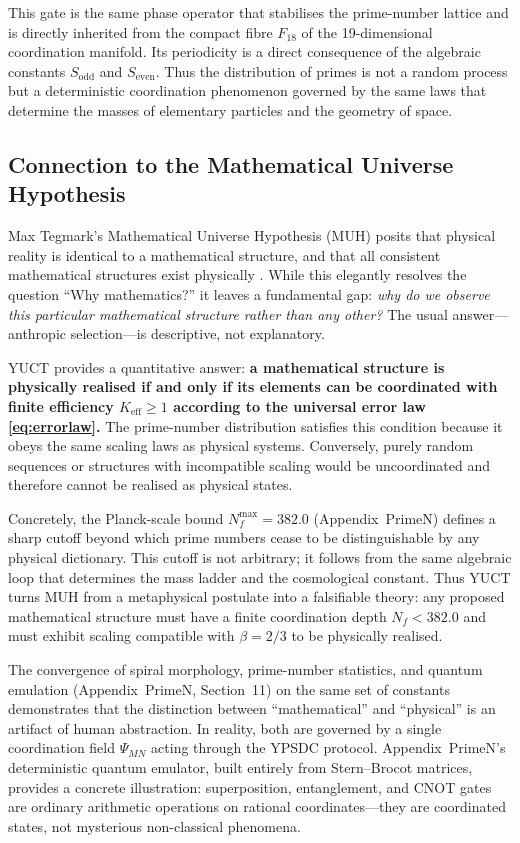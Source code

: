 \documentclass[12pt]{article}
\begin{document}
	This gate is the same phase operator that stabilises the prime-number lattice and is directly inherited from the compact fibre \(F_{18}\) of the 19-dimensional coordination manifold. Its periodicity is a direct consequence of the algebraic constants \(S_{\mathrm{odd}}\) and \(S_{\mathrm{even}}\). Thus the distribution of primes is not a random process but a deterministic coordination phenomenon governed by the same laws that determine the masses of elementary particles and the geometry of space.
	
	\subsection{Connection to the Mathematical Universe Hypothesis}
	
	Max Tegmark's Mathematical Universe Hypothesis (MUH) posits that physical reality is identical to a mathematical structure, and that all consistent mathematical structures exist physically \cite{Tegmark2014}. While this elegantly resolves the question ``Why mathematics?'' it leaves a fundamental gap: \emph{why do we observe this particular mathematical structure rather than any other?} The usual answer—anthropic selection—is descriptive, not explanatory.
	
	YUCT provides a quantitative answer: \textbf{a mathematical structure is physically realised if and only if its elements can be coordinated with finite efficiency \(K_{\mathrm{eff}} \ge 1\) according to the universal error law \eqref{eq:errorlaw}.} The prime-number distribution satisfies this condition because it obeys the same scaling laws as physical systems. Conversely, purely random sequences or structures with incompatible scaling would be uncoordinated and therefore cannot be realised as physical states.
	
	Concretely, the Planck-scale bound \(N_f^{\max} = 382.0\) (Appendix~PrimeN) defines a sharp cutoff beyond which prime numbers cease to be distinguishable by any physical dictionary. This cutoff is not arbitrary; it follows from the same algebraic loop that determines the mass ladder and the cosmological constant. Thus YUCT turns MUH from a metaphysical postulate into a falsifiable theory: any proposed mathematical structure must have a finite coordination depth \(N_f < 382.0\) and must exhibit scaling compatible with \(\beta = 2/3\) to be physically realised.
	
	The convergence of spiral morphology, prime-number statistics, and quantum emulation (Appendix~PrimeN, Section~11) on the same set of constants demonstrates that the distinction between ``mathematical'' and ``physical'' is an artifact of human abstraction. In reality, both are governed by a single coordination field \(\Psi_{MN}\) acting through the YPSDC protocol. Appendix~PrimeN's deterministic quantum emulator, built entirely from Stern--Brocot matrices, provides a concrete illustration: superposition, entanglement, and CNOT gates are ordinary arithmetic operations on rational coordinates—they are coordinated states, not mysterious non-classical phenomena.
	
\end{document}

